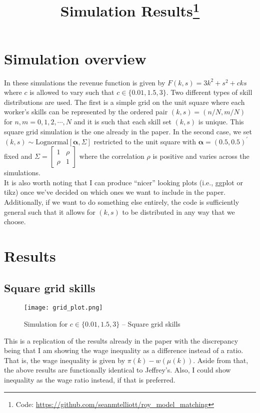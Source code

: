 \documentclass{article}
\title{Simulation Results\footnote{Code: \url{https://github.com/seanmtelliott/roy_model_matching}}}
\author{}
\date{}
\begin{document}
	\maketitle
	
	\section{Simulation overview}
	
	In these simulations the revenue function is given by $F(k,s) = 3k^2 + s^2 + cks$ where $c$ is allowed to vary such that $c\in\{0.01,1.5,3\}$. Two different types of skill distributions are used. The first is a simple grid on the unit square where each worker's skills can be represented by the ordered pair $(k,s) = (n/N,m/N)$ for $n,m = 0,1,2,\cdots, N$ and it is such that each skill set $(k,s)$ is unique. This square grid simulation is the one already in the paper. In the second case, we set $(k,s) \sim \text{Lognormal}[\mathbf{\alpha},\Sigma]$ restricted to the unit square with $\mathbf{\alpha} = (0.5, 0.5)^\prime$ fixed and $\Sigma = \begin{bmatrix}
		1 & \rho \\
		\rho & 1 
	\end{bmatrix}$ where the correlation $\rho$ is positive and varies across the simulations.  \\

	It is also worth noting that I can produce ``nicer'' looking plots (i.e., ggplot or tikz) once we've decided on which ones we want to include in the paper. Additionally, if we want to do something else entirely, the code is sufficiently general such that it allows for $(k,s)$ to be distributed in any way that we choose. 

	\section{Results}
	\subsection{Square grid skills}
	
	\begin{figure}[H]
		\centering
		\texttt{[image: grid\_plot.png]}
		\caption{Simulation for $c\in\{0.01,1.5,3\}$ -- Square grid skills}
	\end{figure}

This is a replication of the results already in the paper with the discrepancy being that I am showing the wage inequality as a difference instead of a ratio. That is, the wage inequality is given by $\pi(k) - w(\mu(k))$. Aside from that, the above results are functionally identical to Jeffrey's. Also, I could show inequality as the wage ratio instead, if that is preferred.
\end{document}
